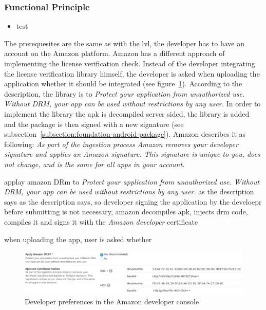 \subsubsection{Functional Principle}\label{section:license-amazon-functional}
\begin{itemize}
    \item test
\end{itemize}
The prerequesites are the same as with the \gls{lvl}, the developer has to have an account on the Amazon platform.
Amazon has a different approach of implementing the license verification check.
Instead of the developer integrating the license verification library himself, the developer is asked when uploading the application whether it should be integrated (see figure~\ref{fig:amazon}).
According to the description, the library is to \textit{Protect your application from unauthorized use. Without DRM, your app can be used without restrictions by any user.} \cite{amazonDeveloper}
In order to implement the library the \gls{apk} is decompiled server sided, the library is added and the package is then signed with a new signature (see subsection~\ref{subsection:foundation-android-package}).
Amazon describes it as following: \textit{As part of the ingestion process Amazon removes your developer signature and applies an Amazon signature. This signature is unique to you, does not change, and is the same for all apps in your account.} \cite{amazonDeveloper}

 applay amazon DRm to \textit{Protect your application from unauthorized use. Without DRM, your app can be used without restrictions by any user.} as the description says
  as the description says, so developer signing the application by the develoepr before submitting is not necessary, amazon decompiles apk, injects drm code, compiles it and signs it with the \textit{Amazon developer} certificate

when uploading the app, user is asked whether
\begin{figure}[h]
    \centering
    \includegraphics[width=1\textwidth]{data/amazon.png}
    \caption{Developer preferences in the Amazon developer console \cite{amazonDeveloper}}
    \label{fig:amazon}
\end{figure}

